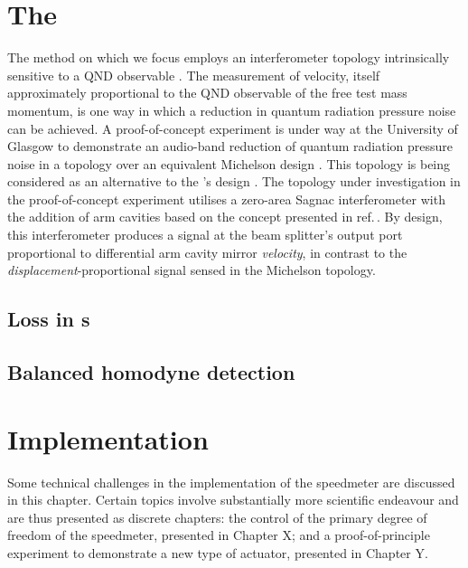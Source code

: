\section{The \SSMEXPT{}}
The method on which we focus employs an interferometer topology intrinsically sensitive to a \gls{QND} observable \cite{Danilishin2012}. The measurement of velocity, itself approximately proportional to the \gls{QND} observable of the free test mass momentum, is one way in which a reduction in quantum radiation pressure noise can be achieved. A proof-of-concept experiment is under way at the University of Glasgow to demonstrate an audio-band reduction of quantum radiation pressure noise in a \SSM{} topology over an equivalent Michelson design \cite{Graef2014}. This topology is being considered as an alternative to the \ET{}'s \MI{} design \cite{MuellerEbhardt2009a, Voronchev2015}. The topology under investigation in the proof-of-concept experiment utilises a zero-area Sagnac interferometer with the addition of arm cavities based on the concept presented in ref.\,\cite{Chen2003}. By design, this interferometer produces a signal at the beam splitter's output port proportional to differential arm cavity mirror \emph{velocity}, in contrast to the \emph{displacement}-proportional signal sensed in the Michelson topology.

\subsection{Loss in \SSM{}s}

\subsection{\label{sec:bhd-intro}Balanced homodyne detection}

\section{Implementation}

Some technical challenges in the implementation of the speedmeter are discussed in this chapter. Certain topics involve substantially more scientific endeavour and are thus presented as discrete chapters: the control of the primary degree of freedom of the speedmeter, presented in Chapter X; and a proof-of-principle experiment to demonstrate a new type of actuator, presented in Chapter Y.

